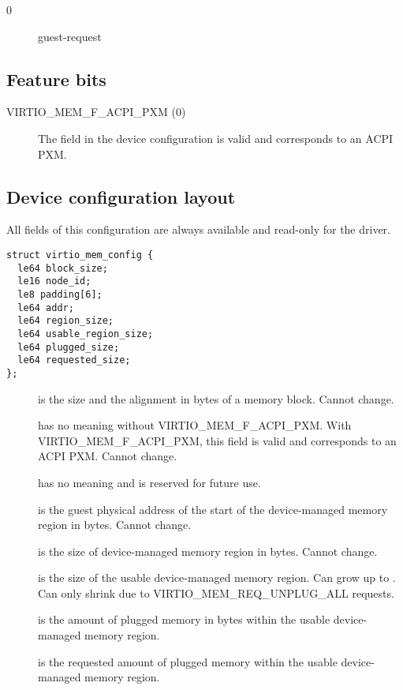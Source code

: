\begin{description}
\item[0] guest-request
\end{description}

\subsection{Feature bits}\label{sec:Device Types / Memory Device / Feature bits}

\begin{description}
\item[VIRTIO_MEM_F_ACPI_PXM (0)] The field  in the device
configuration is valid and corresponds to an ACPI PXM.
\end{description}

\subsection{Device configuration layout}\label{sec:Device Types / Memory Device / Device configuration layout}

All fields of this configuration are always available and read-only for the
driver.

\begin{lstlisting}
struct virtio_mem_config {
  le64 block_size;
  le16 node_id;
  le8 padding[6];
  le64 addr;
  le64 region_size;
  le64 usable_region_size;
  le64 plugged_size;
  le64 requested_size;
};
\end{lstlisting}

\begin{description}
\item[] is the size and the alignment in bytes of a
memory block.  Cannot change.
\item[] has no meaning without VIRTIO_MEM_F_ACPI_PXM.  With
VIRTIO_MEM_F_ACPI_PXM, this field is valid and corresponds to an ACPI PXM.
Cannot change.
\item[] has no meaning and is reserved for future use.
\item[] is the guest physical address of the start of the
device-managed memory region in bytes.  Cannot change.
\item[] is the size of device-managed memory region in
bytes.  Cannot change.
\item[] is the size of the usable device-managed
memory region.  Can grow up to .  Can only shrink due to
VIRTIO_MEM_REQ_UNPLUG_ALL requests.
\item[] is the amount of plugged memory in bytes within
the usable device-managed memory region.
\item[] is the requested amount of plugged memory
within the usable device-managed memory region.
\end{description}

